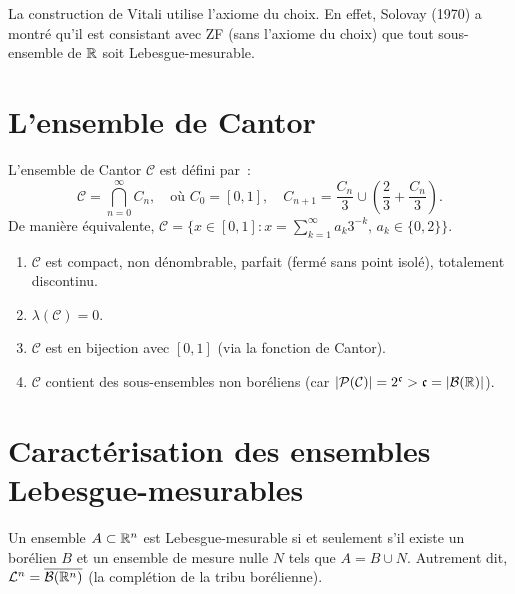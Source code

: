 \begin{attention}[title=\textbf{R\^ole de l'axiome du choix}]
La construction de Vitali utilise l'axiome du choix. En effet, Solovay (1970) a
montr\'e qu'il est consistant avec ZF (sans l'axiome du choix) que tout
sous-ensemble de $\mathbb{R}$ soit Lebesgue-mesurable.
\end{attention}

\section{L'ensemble de Cantor}

\begin{definition}
L'ensemble de Cantor $\mathcal{C}$ est d\'efini par~:
\[
\mathcal{C} = \bigcap_{n=0}^{\infty} C_n, \quad \text{o\`u }
C_0 = [0,1], \quad C_{n+1} = \frac{C_n}{3} \cup \left(\frac{2}{3} + \frac{C_n}{3}\right).
\]
De mani\`ere \'equivalente, $\mathcal{C} = \{x \in [0,1] : x = \sum_{k=1}^{\infty}
a_k 3^{-k},\, a_k \in \{0, 2\}\}$.
\end{definition}

\begin{proposition}
\begin{enumerate}
    \item $\mathcal{C}$ est compact, non d\'enombrable, parfait (ferm\'e sans point
    isol\'e), totalement discontinu.
    \item $\lambda(\mathcal{C}) = 0$.
    \item $\mathcal{C}$ est en bijection avec $[0,1]$ (via la fonction de Cantor).
    \item $\mathcal{C}$ contient des sous-ensembles non bor\'eliens (car
    $\left| \mathcal{P}(\mathcal{C}) \right| = 2^{\mathfrak{c}} > \mathfrak{c} =
    \left| \mathcal{B}(\mathbb{R}) \right|$).
\end{enumerate}
\end{proposition}

\section{Caract\'erisation des ensembles Lebesgue-mesurables}

\begin{theoreme}
Un ensemble $A \subset \mathbb{R}^n$ est Lebesgue-mesurable si et seulement s'il existe un
bor\'elien $B$ et un ensemble de mesure nulle $N$ tels que $A = B \cup N$.
Autrement dit, $\mathcal{L}^n = \overline{\mathcal{B}(\mathbb{R}^n)}$ (la compl\'etion de
la tribu bor\'elienne).
\end{theoreme}

